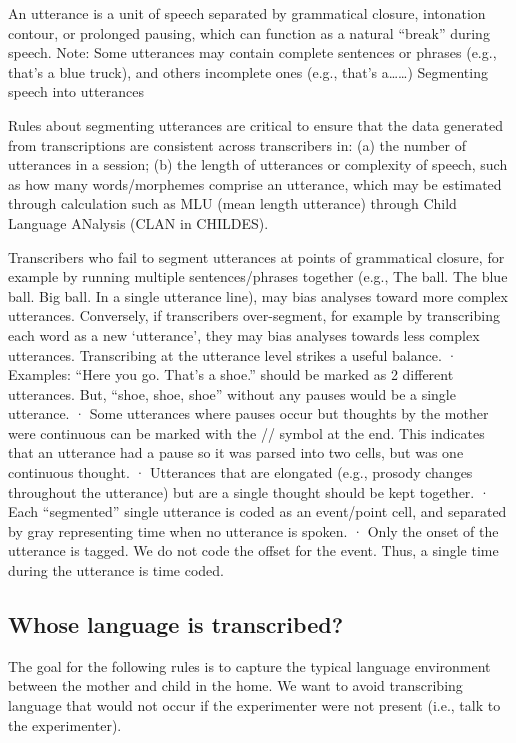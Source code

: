 \documentclass[
]{book}
\begin{document}
An utterance is a unit of speech separated by grammatical closure, intonation contour, or prolonged pausing, which can function as a natural ``break'' during speech. Note: Some utterances may contain complete sentences or phrases (e.g., that's a blue truck), and others incomplete ones (e.g., that's a\ldots\ldots)
Segmenting speech into utterances

Rules about segmenting utterances are critical to ensure that the data generated from transcriptions are consistent across transcribers in: (a) the number of utterances in a session; (b) the length of utterances or complexity of speech, such as how many words/morphemes comprise an utterance, which may be estimated through calculation such as MLU (mean length utterance) through Child Language ANalysis (CLAN in CHILDES).

Transcribers who fail to segment utterances at points of grammatical closure, for example by running multiple sentences/phrases together (e.g., The ball. The blue ball. Big ball. In a single utterance line), may bias analyses toward more complex utterances. Conversely, if transcribers over-segment, for example by transcribing each word as a new `utterance', they may bias analyses towards less complex utterances. Transcribing at the utterance level strikes a useful balance.
· Examples: ``Here you go. That's a shoe.'' should be marked as 2 different utterances. But, ``shoe, shoe, shoe'' without any pauses would be a single utterance.
· Some utterances where pauses occur but thoughts by the mother were continuous can be marked with the // symbol at the end. This indicates that an utterance had a pause so it was parsed into two cells, but was one continuous thought.
· Utterances that are elongated (e.g., prosody changes throughout the utterance) but are a single thought should be kept together.
· Each ``segmented'' single utterance is coded as an event/point cell, and separated by gray representing time when no utterance is spoken.
· Only the onset of the utterance is tagged. We do not code the offset for the event. Thus, a single time during the utterance is time coded.

\hypertarget{whose-language-is-transcribed}{%
\subsection{Whose language is transcribed?}\label{whose-language-is-transcribed}}

The goal for the following rules is to capture the typical language environment between the mother and child in the home. We want to avoid transcribing language that would not occur if the experimenter were not present (i.e., talk to the experimenter).
\end{document}
